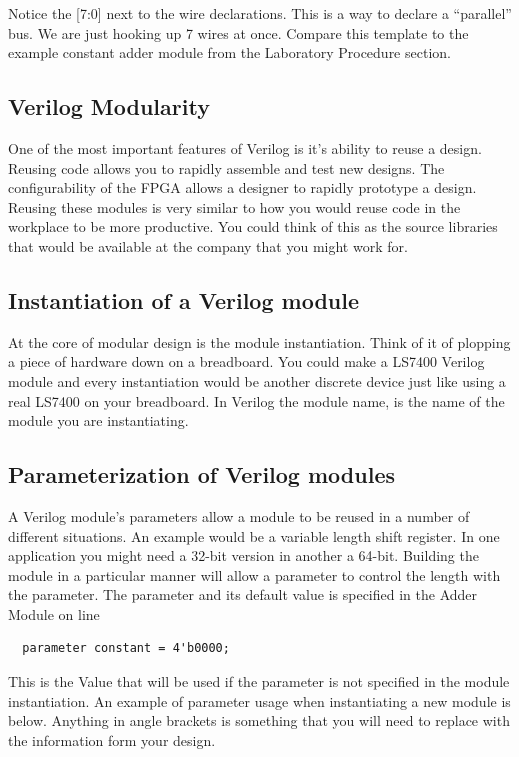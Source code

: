      Notice the [7:0] next to the wire declarations. This is a way to declare a ``parallel'' bus. We are just hooking up 7 wires at once. Compare this template to the example constant adder module from the Laboratory Procedure section.
      
      

    \subsection{Verilog Modularity}
      One of the most important features of Verilog is it's ability to reuse a design. Reusing code allows you to  rapidly assemble and test new designs. The configurability of the FPGA allows a designer to rapidly prototype a design. Reusing these modules is very similar to how you would reuse code in the workplace to be more productive. You could think of this as the source libraries that would be available at the company that you might work for.

    \subsection{Instantiation of a Verilog module}
      At the core of modular design is the module instantiation. Think of it of plopping a piece of hardware down on a breadboard. You could make a LS7400 Verilog module and every instantiation would be another discrete device just like using a real LS7400 on your breadboard. In Verilog the module name, is the name of the module you are instantiating.
      
    
    \subsection{Parameterization of Verilog modules}
      A Verilog module's parameters allow a module to be reused in a number of different situations. An example would be a variable length shift register. In one application you might need a 32-bit version in another a 64-bit. Building the module in a particular manner will allow a parameter to control the length with the parameter. The parameter and its default value is specified in the Adder Module on line
      \begin{lstlisting}
  parameter constant = 4'b0000;
      \end{lstlisting}
      This is the Value that will be used if the parameter is not specified in the module instantiation. An example of parameter usage when instantiating a new module is below. Anything in angle brackets is something that you will need to replace with the information form your design.
      

